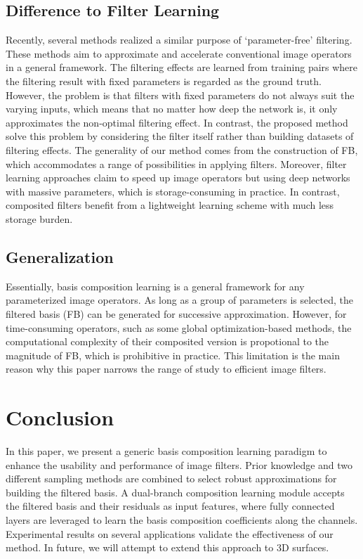 \documentclass[twocolumn]{svjour3}          %
\begin{document}
\subsection{Difference to Filter Learning}
Recently, several methods \cite{xu2015deep,fan2017generic,chen2017fast} realized a similar purpose of `parameter-free' filtering. These methods aim to approximate and accelerate conventional image operators in a general framework. The filtering effects are learned from training pairs where the filtering result with fixed parameters is regarded as the ground truth. However, the problem is that filters with fixed parameters do not always suit the varying inputs, which means that no matter how deep the network is, it only approximates the non-optimal filtering effect. In contrast, the proposed method solve this problem by considering the filter itself rather than building datasets of filtering effects. The generality of our method comes from the construction of FB, which accommodates a range of possibilities in applying filters. Moreover, filter learning approaches claim to speed up image operators but using deep networks with massive parameters, which is storage-consuming in practice. In contrast, composited filters benefit from a lightweight learning scheme with much less storage burden.

\subsection{Generalization}
Essentially, basis composition learning is a general framework for any parameterized image operators. As long as a group of parameters is selected, the filtered basis (FB) can be generated for successive approximation. However, for time-consuming operators, such as some global optimization-based methods, the computational complexity of their composited version is propotional to the magnitude of FB, which is prohibitive in practice. This limitation is the main reason why this paper narrows the range of study to efficient image filters.


\section{Conclusion} \label{sec6}
In this paper, we present a generic basis composition learning paradigm to enhance the usability and performance of image filters. Prior knowledge and two different sampling methods are combined to select robust approximations for building the filtered basis. A dual-branch composition learning module accepts the filtered basis and their residuals as input features, where fully connected layers are leveraged to learn the basis composition coefficients along the channels. Experimental results on several applications validate the effectiveness of our method. In future, we will attempt to extend this approach to 3D surfaces. 


{\small
    
    
}
\end{document}
